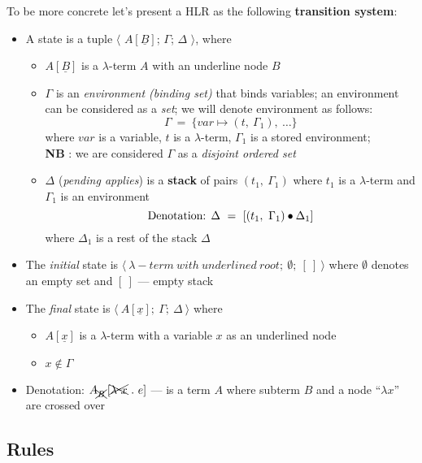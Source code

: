\documentclass[a4paper, 10pt]{article}
\newcommand{\InContext}[2]{{#1}\left[{#2}\right]}
\begin{document}
To be more concrete let's present a HLR as the following \textbf{transition system}:
\begin{itemize}
\item A state is a tuple $\langle$ $A[\underline{B}]$; $\Gamma$; $\Delta$ $\rangle$, where
  \begin{itemize}
  \item $A[\underline{B}]$ is a $\lambda$-term $A$ with an underline node $B$
  \item $\Gamma$ is an \emph{environment (binding set)} that binds variables; an environment can be considered
    as a \emph{set}; we will denote environment as follows:
    $$\Gamma \ = \ \{var \mapsto (t,\ \Gamma_1),\ \dots\}$$ where
    $var$ is a variable, $t$ is a $\lambda$-term, $\Gamma_1$ is a stored environment; \\
    \textbf{NB} : we are considered $\Gamma$ as a \emph{disjoint ordered set}
  \item $\Delta$ (\emph{pending applies}) is a \textbf{stack} of pairs $(t_1, \ \Gamma_1)$ where $t_1$ is a $\lambda$-term
    and $\Gamma_1$ is an environment
    $$\textnormal{Denotation: } \Delta \ = \ [ (t_1,\ \Gamma_1) \bullet \Delta_1 ]$$
    where $\Delta_1$ is a rest of the stack $\Delta$
  \end{itemize}
\item The \emph{initial} state is $\langle\ \lambda-term\ with\ underlined\ root;\ \emptyset;\ [\ ]\ \rangle$
  where $\emptyset$ denotes an empty set and $[\ ]$ --- empty stack
\item The \emph{final} state is $\langle\ A [\underline{x}];\ \Gamma;\ \Delta\ \rangle$ where
  \begin{itemize}
  \item $A [\underline{x}]$ is a $\lambda$-term with a variable $x$ as an underlined node
  \item $x \not\in \Gamma$
  \end{itemize}
\item Denotation: $\InContext{A_{\xcancel{B}}}{\xcancel{\lambda\ x}\ .\ e}$ ---
  is a term $A$ where subterm $B$  and a node ``$\lambda x$'' are crossed over
\end{itemize}

\subsection{Rules}
\end{document}
